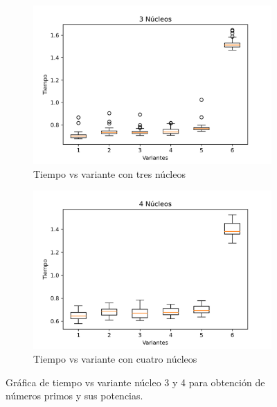 \documentclass{article}
\begin{document}
\begin{figure}[H]
\centering
\begin{subfigure}[b]{0.45\linewidth}
\includegraphics[width=\linewidth]{G_tiempo_3.png}
\caption{Tiempo vs variante con tres núcleos}
\end{subfigure}
\begin{subfigure}[b]{0.45\linewidth}
\includegraphics[width=\linewidth]{G_tiempo_4.png}
\caption{Tiempo vs variante con cuatro núcleos}
\end{subfigure}
\caption{Gráfica de tiempo vs variante núcleo 3 y 4 para obtención de números primos y sus potencias.}
\label{fig:westminster}
\end{figure}
\end{document}
